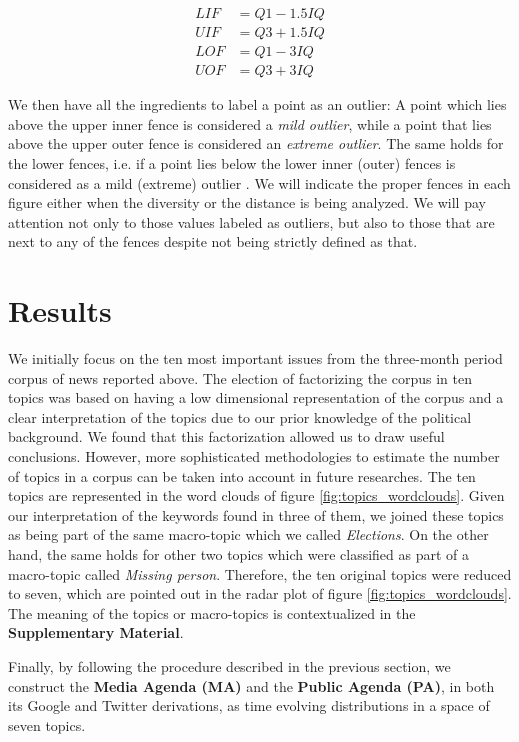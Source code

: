 \documentclass{bmcart}
\begin{document}
\begin{eqnarray}\label{eq:fences}
LIF & = Q1 - 1.5 IQ \nonumber \\
UIF & = Q3 + 1.5 IQ \nonumber\\
LOF & = Q1 - 3 IQ \nonumber \\
UOF & = Q3 + 3 IQ
\end{eqnarray}
\par We then have all the ingredients to label a point as an outlier: A point which lies above the upper inner fence is considered a \emph{mild outlier}, while a point that lies above the upper outer fence is considered an \emph{extreme outlier}. The same holds for the lower fences, i.e. if a point lies below the lower inner (outer) fences is considered as a mild (extreme) outlier \cite{natrella2010nist}. 
We will indicate the proper fences in each figure either when the diversity or the distance is being analyzed. We will pay attention not only to those values labeled as outliers, but also to those that are next to any of the fences despite not being strictly defined as that.

\section*{Results}
\label{results}

\par We initially focus on the ten most important issues from the three-month period corpus of news reported above. 
The election of factorizing the corpus in ten topics was based on having a low dimensional representation of the corpus and a clear interpretation of the topics due to our prior knowledge of the political background. 
We found that this factorization allowed us to draw useful conclusions. However, more sophisticated methodologies to estimate the number of topics in a corpus can be taken into account in future researches.
The ten topics are represented in the word clouds of figure \ref{fig:topics_wordclouds}.
Given our interpretation of the keywords found in three of them, we joined these topics as being part of the same macro-topic which we called \emph{Elections}.
On the other hand, the same holds for other two topics which were classified as part of a macro-topic called \emph{Missing person}. 
Therefore, the ten original topics were reduced to seven, which are pointed out in the radar plot of figure \ref{fig:topics_wordclouds}.
The meaning of the topics or macro-topics is contextualized in the \textbf{Supplementary Material}.
\par Finally, by following the procedure described in the previous section, we construct the \textbf{Media Agenda (MA)} and the \textbf{Public Agenda (PA)}, in both its Google and Twitter derivations, as time evolving distributions in a space of seven topics.
\end{document}
